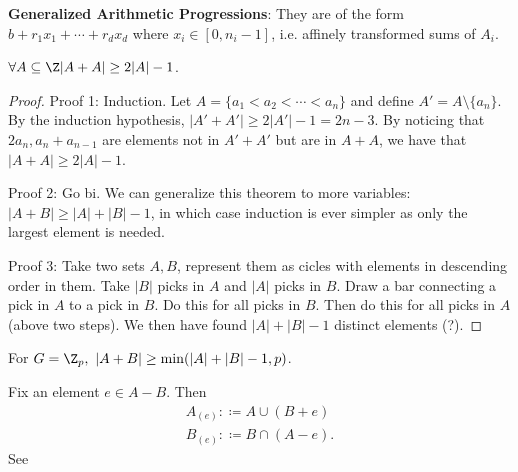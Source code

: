 \documentclass[a4paper]{article}
\begin{document}
\begin{definition}
	\textbf{Generalized Arithmetic Progressions}: They are of the form $b + r_{1}x_{1}+\cdots + r_dx_d $ where $x_i \in [0,n_i-1]$, i.e. affinely transformed sums of $A_i $.
\end{definition}

\begin{thm}
	$\forall A \subseteq \Z |A+A| \ge 2|A|-1$.
\end{thm}

\begin{proof}
	Proof 1: Induction. Let $A = \{a_{1} < a_{2} < \cdots < a_n\}   $ and define $A' = A \setminus \{a_n\}   $.
	By the induction hypothesis, $|A'+A'| \ge 2|A'| - 1 = 2n-3 $.
	By noticing that $2a_n, a_n + a_{n-1} $ are elements not in $A'+A' $ but are in $A+A $, we have that $|A+A| \ge 2|A| - 1 $.

	Proof 2: Go bi. We can generalize this theorem to more variables: $|A+B| \ge |A| + |B| - 1 $, in which case induction is ever simpler as only the largest element is needed.

	Proof 3: Take two sets $A,B $, represent them as cicles with elements in descending order in them.
	Take $|B| $ picks in $A $ and $|A| $ picks in $B $.
	Draw a bar connecting a pick in $A $ to a pick in $B $.
	Do this for all picks in $B $.
	Then do this for all picks in $A $ (above two steps).
	We then have found $|A| + |B| - 1 $ distinct elements (?).
\end{proof}

\begin{thm}
	For $G = \Z_p,\ |A+B| \ge \min(|A|+|B| - 1, p) $.
\end{thm}

\begin{definition}
	Fix an element $e \in A-B $.
	Then
	\begin{align*}
		A_{(e)} :\coloneqq  A \cup (B+e) \\
		B_{(e)} :\coloneqq B \cap (A - e)
	.\end{align*}
	See 
\end{definition}
\end{document}
